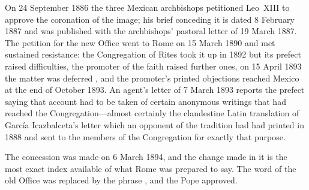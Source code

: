 On 24 September 1886 the three Mexican archbishops petitioned Leo~XIII
to approve the coronation of the image; his brief conceding it is
dated 8 February 1887 and was published with the archbishops' pastoral
letter of 19 March 1887. The petition for the new Office went to Rome
on 15 March 1890 and met sustained resistance: the Congregation of
Rites took it up in 1892 but its prefect raised difficulties, the
promoter of the faith raised further ones, on 15 April 1893 the matter
was deferred , and the
promoter's printed objections reached Mexico at the end of October
1893. An agent's letter of 7 March 1893 reports the prefect saying
that account had to be taken of certain anonymous writings that had
reached the Congregation---almost certainly the clandestine Latin
translation of Garc\'ia Icazbalceta's letter which an opponent of the
tradition had had printed in 1888 and sent to the members of the
Congregation for exactly that purpose.

The concession was made on 6 March 1894, and the change made in it is
the most exact index available of what Rome was prepared to say. The
word  of the old Office was replaced by the phrase
, and the Pope approved.

